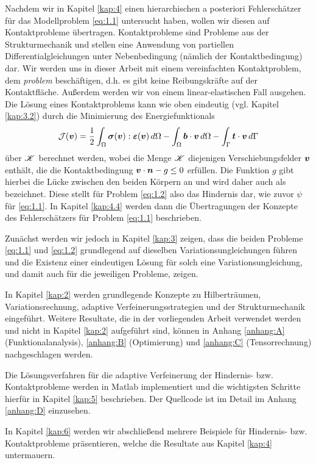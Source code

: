 Nachdem wir in Kapitel \ref{kap:4} einen hierarchischen a posteriori Fehlerschätzer für das Modellproblem \eqref{eq:1.1} untersucht haben, wollen wir diesen auf Kontaktprobleme übertragen. Kontaktprobleme sind Probleme aus der Strukturmechanik und stellen eine Anwendung von partiellen Differentialgleichungen unter Nebenbedingung (nämlich der Kontaktbedingung) dar. Wir werden uns in dieser Arbeit mit einem vereinfachten Kontaktproblem, dem \textit{problem} beschäftigen, d.h. es gibt keine Reibungskräfte auf der Kontaktfläche. Außerdem werden wir von einem linear-elastischen Fall ausgehen. Die Lösung eines Kontaktproblems kann wie oben eindeutig (vgl. Kapitel \ref{kap:3.2}) durch die Minimierung des Energiefunktionals
\begin{align}\label{eq:1.2}
	\mathcal J (\boldsymbol v) = \frac 12 \int_\Omega \boldsymbol \sigma (\boldsymbol v):\boldsymbol {\varepsilon}(\boldsymbol v) \, d\Omega - \int_\Omega \boldsymbol b\cdot \boldsymbol v \, d\Omega - \int_{\Gamma} \boldsymbol t\cdot \boldsymbol v \, d\Gamma 
\end{align}
über $\mathscr K$ berechnet werden, wobei die Menge $\mathscr K$ diejenigen Verschiebungsfelder $\boldsymbol v$ enthält, die die Kontaktbedingung $\boldsymbol v \cdot\boldsymbol n - g \le 0$ erfüllen. Die Funktion $g$ gibt hierbei die Lücke zwischen den beiden Körpern an und wird daher auch als \textit{} bezeichnet. Diese  stellt für Problem \eqref{eq:1.2} also das Hindernis dar, wie zuvor $\psi$ für \eqref{eq:1.1}. In Kapitel \ref{kap:4.4} werden dann die Übertragungen der Konzepte des Fehlerschätzers für Problem \eqref{eq:1.1} beschrieben.

Zunächst werden wir jedoch in Kapitel \ref{kap:3} zeigen, dass die beiden Probleme \eqref{eq:1.1} und \eqref{eq:1.2} grundlegend auf dieselben Variationsungleichungen führen und die Existenz einer eindeutigen Lösung für solch eine Variationsungleichung, und damit auch für die jeweiligen Probleme, zeigen.

In Kapitel \ref{kap:2} werden grundlegende Konzepte zu Hilberträumen, Variationsrechnung, adaptive Verfeinerungsstrategien und der Strukturmechanik eingeführt. Weitere Resultate, die in der vorliegenden Arbeit verwendet werden und nicht in Kapitel \ref{kap:2} aufgeführt sind, können in Anhang \ref{anhang:A} (Funktionalanalysis), \ref{anhang:B} (Optimierung) und \ref{anhang:C} (Tensorrechnung) nachgeschlagen werden.

Die Lösungsverfahren für die adaptive Verfeinerung der Hindernis- bzw. Kontaktprobleme werden in Matlab implementiert und die wichtigsten Schritte hierfür in Kapitel \ref{kap:5} beschrieben. Der Quellcode ist im Detail im Anhang \ref{anhang:D} einzusehen.

In Kapitel \ref{kap:6} werden wir abschließend mehrere Beispiele für Hindernis- bzw. Kontaktprobleme präsentieren, welche die Resultate aus Kapitel \ref{kap:4} untermauern.



\newpage

